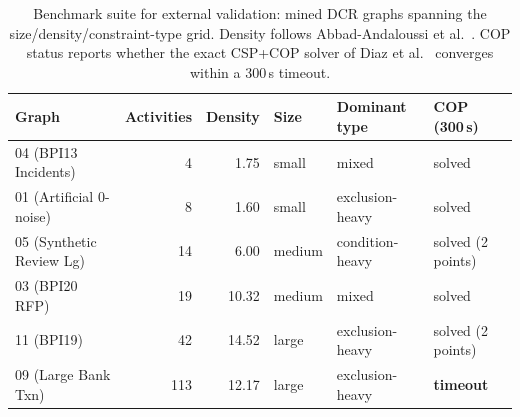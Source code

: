 \begin{table}[H]
\centering
\caption{Benchmark suite for external validation: mined \ac{DCR}
graphs spanning the size/density/constraint-type grid. Density follows
Abbad-Andaloussi et al.~\cite{AbbadAndaloussi2023Complexity}. COP status
reports whether the exact CSP+COP solver of Diaz et
al.~\cite{Diaz2024Pareto-OptimalModels} converges within a 300\,s
timeout.}
\label{tab:external_grid}
\begin{tabular}{lrrlll}
\toprule
\textbf{Graph} & \textbf{Activities} & \textbf{Density} &
\textbf{Size} & \textbf{Dominant type} & \textbf{COP (300\,s)} \\
\midrule
04 (BPI13 Incidents)     & 4   & 1.75  & small  & mixed           & solved \\
01 (Artificial 0-noise)  & 8   & 1.60  & small  & exclusion-heavy & solved \\
05 (Synthetic Review Lg) & 14  & 6.00  & medium & condition-heavy & solved (2 points) \\
03 (BPI20 RFP)           & 19  & 10.32 & medium & mixed           & solved \\
11 (BPI19)               & 42  & 14.52 & large  & exclusion-heavy & solved (2 points) \\
09 (Large Bank Txn)      & 113 & 12.17 & large  & exclusion-heavy & \textbf{timeout} \\
\bottomrule
\end{tabular}
\end{table}

